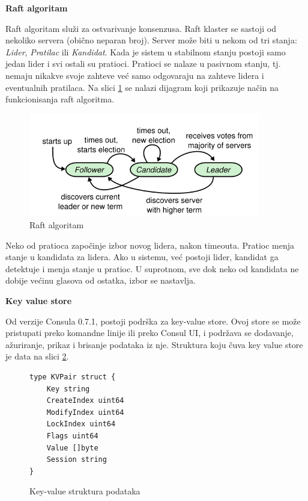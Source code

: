 \documentclass[a4paper,12pt]{report}
\begin{document}
\textbf{Raft algoritam}\newline

Raft algoritam služi za ostvarivanje konsenzusa. Raft klaster se sastoji od  nekoliko servera (obično neparan broj). Server može biti u nekom od tri stanja: \textit{Lider}, \textit{Pratilac} ili \textit{Kandidat}. Kada je sistem u stabilnom stanju postoji samo jedan lider i svi ostali su pratioci. Pratioci se nalaze u pasivnom stanju, tj. nemaju nikakve svoje zahteve već samo odgovaraju na zahteve lidera i eventualnih pratilaca. Na slici \ref{fig:raft-algorithms} se nalazi dijagram koji prikazuje način na funkcionisanja raft algoritma. \newline 

\begin{figure}[h]
    \centering
    \includegraphics[width=0.9\textwidth]{raft_algorithm}
    \caption{Raft algoritam}
    \label{fig:raft-algorithms}
\end{figure} 

Neko od pratioca započinje izbor novog lidera, nakon timeouta. Pratioc menja stanje u kandidata za lidera. Ako u sistemu, već postoji lider, kandidat ga detektuje i menja stanje u pratioc. U suprotnom, sve dok neko od kandidata ne dobije većinu glasova od ostatka, izbor se nastavlja. \newline

\textbf{Key value store}\newline

Od verzije Consula 0.7.1, postoji podrška za key-value store. Ovoj store se može pristupati preko komandne linije ili preko Consul UI, i podržava se dodavanje, ažuriranje, prikaz i brisanje podataka iz nje. Struktura koju čuva key value store je data na slici \ref{kv-ds}. \newline

\begin{figure}

\begin{verbatim}
type KVPair struct {
   	Key string
   	CreateIndex uint64
   	ModifyIndex uint64
   	LockIndex uint64
   	Flags uint64
   	Value []byte
   	Session string
}
\end{verbatim}
    \caption{Key-value struktura podataka}
    \label{kv-ds}
\end{figure}
\end{document}
